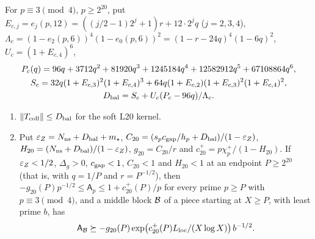 \begin{proposition}
\label{prop:l20-collisions}
For $p\equiv3\pmod4$, $p\ge2^{20}$, put $E_{c,j}=e_j(p,12)
=((j/2-1)2^j+1)r+12\cdot2^jq$ ($j=2,3,4$),
$\Lambda_c=(1-e_2(p,6))^4(1-e_0(p,6))^2=(1-r-24q)^4(1-6q)^2$,
$U_c=(1+E_{c,4})^6$,
\begin{gather*}
 P_c(q)=96q+3712q^2+81920q^3+1245184q^4+12582912q^5+67108864q^6,\\
 S_c=32q(1+E_{c,3})^2(1+E_{c,4})^3+64q(1+E_{c,2})(1+E_{c,3})^2(1+E_{c,4})^2,\\
 D_{\rm bal}=\frac{S_c+U_c(P_c-96q)}{\Lambda_c}.
\end{gather*}
\begin{enumerate}[label=\textup{(\alph*)}]
\item $\norm{T_{\rm coll}}\le D_{\rm bal}$ for the soft L20 kernel.
\item Put $\eps_Z=N_{\rm ns}+D_{\rm bal}+m_\star$,
 $C_{20}=(s_pc_{\rm gap}/h_p+D_{\rm bal})/(1-\eps_Z)$,
 $H_{20}=(N_{\rm ns}+D_{\rm bal})/(1-\eps_Z)$, $g_{20}=C_{20}/r$ and
 $c^+_{20}=p\chi^+_p/(1-H_{20})$. If $\eps_Z<1/2$, $\Delta_g>0$,
 $c_{\rm gap}<1$, $C_{20}<1$ and $H_{20}<1$ at an endpoint $P\ge2^{20}$ (that
 is, with $q=1/P$ and $r=P^{-1/2}$), then
 $-g_{20}(P)p^{-1/2}\le\mathsf A_p\le1+c^+_{20}(P)/p$ for every prime $p\ge P$
 with $p\equiv3\pmod4$, and a middle block $\Blk$ of a piece starting at
 $X\ge P$, with least prime $b$, has
 \[
  \mathsf A_{\Blk}\succeq-g_{20}(P)\exp\bigl(c^+_{20}(P)L_{\rm loc}/(X\log X)\bigr)
  \,b^{-1/2}.
 \]
\end{enumerate}
\end{proposition}

